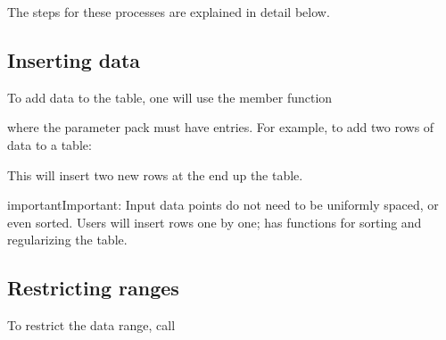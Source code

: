 \documentclass[letterpaper,10pt,english]{sphinxmanual}
\begin{document}
The steps for these processes are explained in detail below.


\subsection{Inserting data}
\label{\detokenize{Utilities/LookupTable:inserting-data}}
To add data to the table, one will use the member function

\begin{sphinxVerbatim}[commandchars=\\\{\},formatcom=\scriptsize]
  
   
\end{sphinxVerbatim}

where the parameter pack must have  entries.
For example, to add two rows of data to a table:

\begin{sphinxVerbatim}[commandchars=\\\{\},formatcom=\scriptsize]
 

  
  
\end{sphinxVerbatim}

This will insert two new rows at the end up the table.

\begin{sphinxadmonition}{important}{Important:}
Input data points do not need to be uniformly spaced, or even sorted.
Users will insert rows one by one;  has functions for sorting and regularizing the table.
\end{sphinxadmonition}


\subsection{Restricting ranges}
\label{\detokenize{Utilities/LookupTable:restricting-ranges}}
To restrict the data range, call
\end{document}
